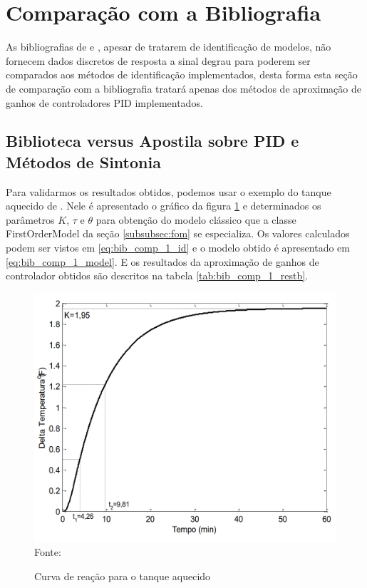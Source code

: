 \section{Comparação com a Bibliografia}

As bibliografias de \cite{ogata2010engenharia} e \cite{CoelhoIdentificacao}, apesar de tratarem de identificação de
modelos, não fornecem dados discretos de resposta a sinal degrau para poderem ser comparados aos métodos de
identificação implementados, desta forma esta seção de comparação com a bibliografia tratará apenas dos métodos de
aproximação de ganhos de controladores PID implementados.

\subsection{Biblioteca versus Apostila sobre PID e Métodos de Sintonia}

Para validarmos os resultados obtidos, podemos usar o exemplo do tanque aquecido de \cite{apostpidsint}.
Nele é apresentado o gráfico da figura \ref{fig:bib_comp_1_graph} e determinados os parâmetros $K$, $\tau$ e $\theta$ para
obtenção do modelo clássico que a classe FirstOrderModel da seção \ref{subsubsec:fom} se especializa.
Os valores calculados podem ser vistos em \ref{eq:bib_comp_1_id} e o modelo obtido é apresentado em
\ref{eq:bib_comp_1_model}.
E os resultados da aproximação de ganhos de controlador obtidos são descritos na tabela \ref{tab:bib_comp_1_restb}.


\begin{figure}[H]
    \centering
    \caption{Curva de reação para o tanque aquecido}
    \includegraphics[scale=0.4]{figuras/bib_comp_1_graph}
    \label{fig:bib_comp_1_graph}
    \\
    \vspace{0cm}\hspace{0cm}\small{Fonte: \cite{apostpidsint}}
\end{figure}


